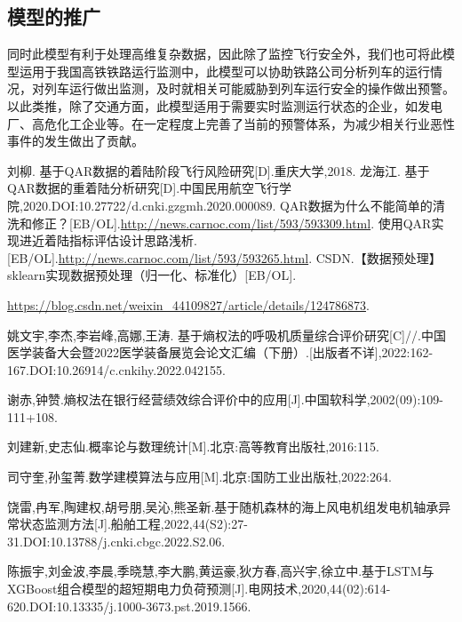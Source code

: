 \documentclass{MathorCupModeling}
\begin{document}
	\subsection{模型的推广}
	同时此模型有利于处理高维复杂数据，因此除了监控飞行安全外，我们也可将此模型运用于我国高铁铁路运行监测中，此模型可以协助铁路公司分析列车的运行情况，对列车运行做出监测，及时就相关可能威胁到列车运行安全的操作做出预警。以此类推，除了交通方面，此模型适用于需要实时监测运行状态的企业，如发电厂、高危化工企业等。在一定程度上完善了当前的预警体系，为减少相关行业恶性事件的发生做出了贡献。
	
	\newpage
	\begin{spacing}{1.08}
	\begin{thebibliography}{99}
	刘柳. 基于QAR数据的着陆阶段飞行风险研究[D].重庆大学,2018.
	龙海江. 基于QAR数据的重着陆分析研究[D].中国民用航空飞行学院,2020.DOI:10.27722/d.cnki.gzgmh.2020.000089.
	QAR数据为什么不能简单的清洗和修正？[EB/OL].\url{http://news.carnoc.com/list/593/593309.html}.
	使用QAR实现进近着陆指标评估设计思路浅析.[EB/OL].\url{http://news.carnoc.com/list/593/593265.html}.
	CSDN.【数据预处理】sklearn实现数据预处理（归一化、标准化）[EB/OL].
	
	\url{https://blog.csdn.net/weixin_44109827/article/details/124786873}.

	姚文宇,李杰,李岩峰,高娜,王涛. 基于熵权法的呼吸机质量综合评价研究[C]//.中国医学装备大会暨2022医学装备展览会论文汇编（下册）.[出版者不详],2022:162-167.DOI:10.26914/c.cnkihy.2022.042155.

	谢赤,钟赞.熵权法在银行经营绩效综合评价中的应用[J].中国软科学,2002(09):109-111+108.

	刘建新,史志仙.概率论与数理统计[M].北京:高等教育出版社,2016:115.

	司守奎,孙玺菁.数学建模算法与应用[M].北京:国防工业出版社,2022:264.

	饶雷,冉军,陶建权,胡号朋,吴沁,熊圣新.基于随机森林的海上风电机组发电机轴承异常状态监测方法[J].船舶工程,2022,44(S2):27-31.DOI:10.13788/j.cnki.cbgc.2022.S2.06.

	陈振宇,刘金波,李晨,季晓慧,李大鹏,黄运豪,狄方春,高兴宇,徐立中.基于LSTM与XGBoost组合模型的超短期电力负荷预测[J].电网技术,2020,44(02):614-620.DOI:10.13335/j.1000-3673.pst.2019.1566.


\end{thebibliography}
\end{spacing}
\end{document}

